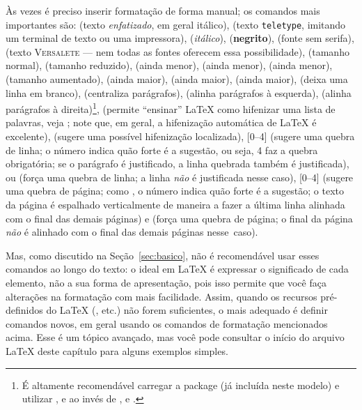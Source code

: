 Às vezes é preciso inserir formatação de forma manual; os comandos mais
importantes são:
 (texto \emph{enfatizado}, em geral itálico),
 (texto \texttt{teletype}, imitando um
terminal de texto ou uma impressora),
 (\textit{itálico}),
 (\textbf{negrito}),
 (fonte \textsf{sem serifa}),
 (texto \textsc{Versalete} --- nem todas
as fontes oferecem essa possibilidade),
 (tamanho normal),
 (tamanho reduzido),
 (ainda menor),
 (ainda menor),
 (ainda menor),
 (tamanho aumentado),
 (ainda maior),
 (ainda maior),
 (ainda maior),
 (deixa uma linha em branco),
 (centraliza parágrafos),
 (alinha parágrafos à esquerda),
 (alinha parágrafos à direita)\footnote{É
altamente recomendável carregar a package  (já incluída
neste modelo) e utilizar ,  e
 ao invés de , 
e .},
 (permite ``ensinar'' \LaTeX{} como hifenizar
uma lista de palavras, veja ; note que, em geral, a
hifenização automática de \LaTeX{} é excelente),
\ltxcmd{-} (sugere uma possível hifenização localizada),
[0--4] (sugere uma quebra de linha; o número indica
quão forte é a sugestão, ou seja, 4 faz a quebra obrigatória; se o
parágrafo é justificado, a linha quebrada também é justificada),
 ou \cmd{\sla\sla} (força uma quebra de linha; a
linha \emph{não} é justificada nesse caso),
[0--4] (sugere uma quebra de página; como
, o número indica quão forte é a sugestão; o texto
da página é espalhado verticalmente de maneira a fazer a última linha
alinhada com o final das demais páginas) e
 (força uma quebra de página; o final da página
\emph{não} é alinhado com o final das demais páginas nesse~caso).

Mas, como discutido na Seção~\ref{sec:basico}, não é recomendável
usar esses comandos ao longo do texto: o ideal em \LaTeX{} é expressar
o significado de cada elemento, não a sua forma de apresentação,
pois isso permite que você faça alterações na formatação com mais
facilidade. Assim, quando os recursos pré-definidos do \LaTeX{}
(,  etc.) não forem suficientes,
o mais adequado é definir comandos novos, em geral usando os comandos
de formatação mencionados acima. Esse é um tópico avançado, mas você
pode consultar o início do arquivo \LaTeX{} deste capítulo para alguns
exemplos simples.

